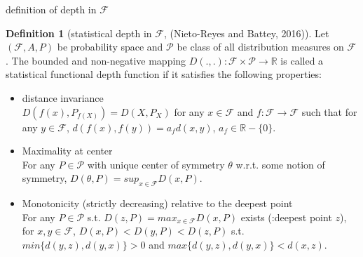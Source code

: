 \documentclass[aspectratio=169,ignorenonframetext,9pt]{beamer}
\theoremstyle{plain}
\theoremstyle{definition}
\newtheorem{defn}{Definition}[section]
\begin{document}
\begin{frame}{definition of depth in $\mathcal{F}$}
    \begin{defn}[statistical depth in $\mathcal{F}$, (Nieto-Reyes and Battey, 2016)]
        Let $(\mathcal{F},A,P)$ be probability space and $\mathcal{P}$ be class of all distribution measures on $\mathcal{F}$.
        The bounded and non-negative mapping $D(.,.): \mathcal{F}\times \mathcal{P} \rightarrow \mathbb{R}$ is called
        a statistical functional depth function if it satisfies the following properties:
        \begin{itemize}
            \item distance invariance \\
                $D(f(x),P_{f(X)})=D(X,P_X)$ for any $x\in\mathcal{F}$ and $f:\mathcal{F}\rightarrow\mathcal{F}$
                such that for any $y\in\mathcal{F}$, $d(f(x),f(y))=a_fd(x,y)$, $a_f\in\mathbb{R}-\{0\}$.
            \item Maximality at center \\
                For any $P\in\mathcal{P}$ with unique center of symmetry 
                $\theta$ w.r.t. some notion of symmetry, 
                $D(\theta,P)=sup_{x\in\mathcal{F}}D(x,P)$.
            \item Monotonicity (strictly decreasing) relative to the deepest point \\
                For any $P \in \mathcal{P}$ s.t. $D(z,P)=max_{x\in\mathcal{F}}D(x,P)$ exists (:deepest point $z$), 
                for $x,y\in\mathcal{F}$, $D(x,P)<D(y,P)<D(z,P)$ s.t. $min\{d(y,z),d(y,x)\}>0$ and $max\{d(y,z), d(y,x)\}<d(x,z)$.
            
        \end{itemize}
        \end{defn}
\end{frame}
\end{document}
